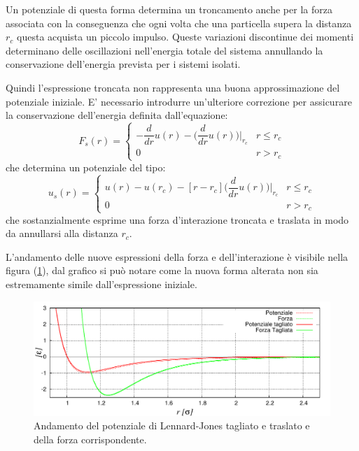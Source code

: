 Un potenziale di questa forma determina un troncamento anche per la forza associata con la conseguenza che 
ogni volta che una particella supera la distanza $r_c$ questa acquista un piccolo impulso.
Queste variazioni discontinue dei momenti determinano delle oscillazioni nell'energia totale del sistema annullando la conservazione dell'energia prevista per i sistemi isolati.

Quindi l'espressione troncata non rappresenta una buona approssimazione del potenziale iniziale.
E' necessario introdurre un'ulteriore correzione per assicurare la conservazione dell'energia definita dall'equazione:
\begin{equation}\label{eq: forza usata}
	F_{s}(r) = 
	\begin{cases}
	 -\dfrac{d}{dr} u(r) - \biggr(\dfrac{d}{dr} u(r)\biggr)\Biggr\vert_{r_c} & r \leq r_c\\
	0 & r > r_c 
	\end{cases}
\end{equation}
che determina un potenziale del tipo:
\begin{equation}\label{eq: potenziale usato}
	u_{s}(r) = 
	\begin{cases} u(r) - u(r_c) -[r -r_c]\biggr(\dfrac{d}{dr} u(r)\biggr)\Biggr\vert_{r_c} & r \leq r_c\\
	0 & r > r_c \end{cases}
\end{equation}
che sostanzialmente esprime una forza d'interazione troncata e traslata in modo da annullarsi alla distanza $r_c$.

L'andamento delle nuove espressioni della forza e dell'interazione è visibile nella figura (\ref{fig: LJCut}), dal grafico si può notare come la nuova forma alterata non sia estremamente simile dall'espressione iniziale.

	\begin{figure}[htbp]
		\centering
		\includegraphics[scale=0.95]{Immagini/Soffici/potenziale}
		\caption[Potenziale di L.-J. tagliato]{Andamento del potenziale di Lennard-Jones tagliato e traslato e della forza corrispondente.}\label{fig: LJCut}
	\end{figure}

